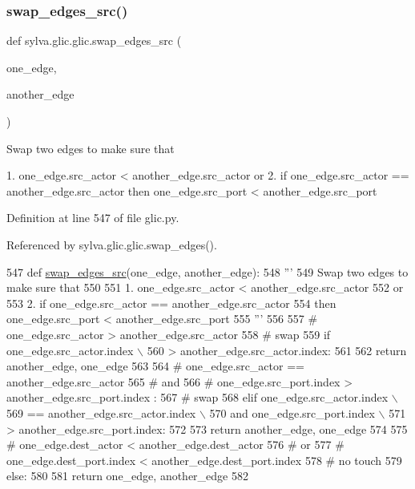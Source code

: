 \subsubsection{\texorpdfstring{swap\+\_\+edges\+\_\+src()}{swap\_edges\_src()}}
{\footnotesize\ttfamily def sylva.\+glic.\+glic.\+swap\+\_\+edges\+\_\+src (\begin{DoxyParamCaption}\item[{}]{one\+\_\+edge,  }\item[{}]{another\+\_\+edge }\end{DoxyParamCaption})}

\begin{DoxyVerb}  Swap two edges to make sure that

  1. one_edge.src_actor < another_edge.src_actor
  or
  2. if one_edge.src_actor == another_edge.src_actor
     then one_edge.src_port < another_edge.src_port
\end{DoxyVerb}
 

Definition at line 547 of file glic.\+py.



Referenced by sylva.\+glic.\+glic.\+swap\+\_\+edges().


\begin{DoxyCode}
547   \textcolor{keyword}{def }\hyperlink{namespacesylva_1_1glic_1_1glic_a6e0ff8a8e5ef9956ef0b31be0fb0bf0e}{swap\_edges\_src}(one\_edge, another\_edge):
548     \textcolor{stringliteral}{'''}
549 \textcolor{stringliteral}{      Swap two edges to make sure that}
550 \textcolor{stringliteral}{}
551 \textcolor{stringliteral}{      1. one\_edge.src\_actor < another\_edge.src\_actor}
552 \textcolor{stringliteral}{      or}
553 \textcolor{stringliteral}{      2. if one\_edge.src\_actor == another\_edge.src\_actor}
554 \textcolor{stringliteral}{         then one\_edge.src\_port < another\_edge.src\_port}
555 \textcolor{stringliteral}{    '''}
556 
557     \textcolor{comment}{# one\_edge.src\_actor > another\_edge.src\_actor}
558     \textcolor{comment}{# swap}
559     \textcolor{keywordflow}{if} one\_edge.src\_actor.index \(\backslash\)
560             > another\_edge.src\_actor.index:
561 
562       \textcolor{keywordflow}{return} another\_edge, one\_edge
563 
564     \textcolor{comment}{# one\_edge.src\_actor == another\_edge.src\_actor}
565     \textcolor{comment}{# and}
566     \textcolor{comment}{# one\_edge.src\_port.index > another\_edge.src\_port.index :}
567     \textcolor{comment}{# swap}
568     \textcolor{keywordflow}{elif} one\_edge.src\_actor.index \(\backslash\)
569         == another\_edge.src\_actor.index \(\backslash\)
570         \textcolor{keywordflow}{and} one\_edge.src\_port.index \(\backslash\)
571             > another\_edge.src\_port.index:
572 
573       \textcolor{keywordflow}{return} another\_edge, one\_edge
574 
575     \textcolor{comment}{# one\_edge.dest\_actor < another\_edge.dest\_actor}
576     \textcolor{comment}{# or}
577     \textcolor{comment}{# one\_edge.dest\_port.index < another\_edge.dest\_port.index}
578     \textcolor{comment}{# no touch}
579     \textcolor{keywordflow}{else}:
580 
581       \textcolor{keywordflow}{return} one\_edge, another\_edge
582 
\end{DoxyCode}


